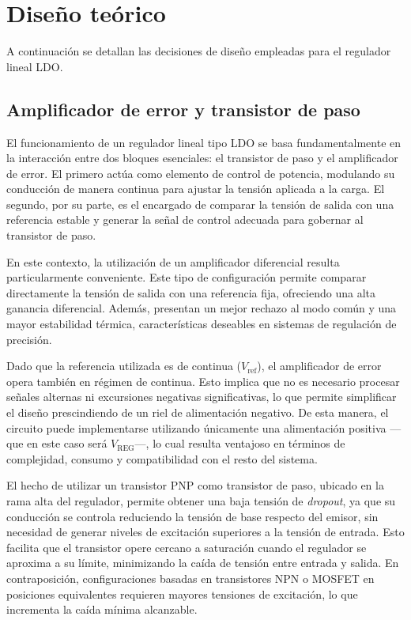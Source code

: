 \documentclass[a4paper,12pt]{article}
\begin{document}
\section{Diseño teórico}

A continuación se detallan las decisiones de diseño empleadas para el regulador lineal LDO.

\subsection{Amplificador de error y transistor de paso}

El funcionamiento de un regulador lineal tipo LDO se basa fundamentalmente en la interacción entre dos bloques esenciales: el transistor de paso y el amplificador de error. El primero actúa como elemento de control de potencia, modulando su conducción de manera continua para ajustar la tensión aplicada a la carga. El segundo, por su parte, es el encargado de comparar la tensión de salida con una referencia estable y generar la señal de control adecuada para gobernar al transistor de paso.

En este contexto, la utilización de un amplificador diferencial resulta particularmente conveniente. Este tipo de configuración permite comparar directamente la tensión de salida con una referencia fija, ofreciendo una alta ganancia diferencial. Además, presentan un mejor rechazo al modo común y una mayor estabilidad térmica, características deseables en sistemas de regulación de precisión.

Dado que la referencia utilizada es de continua ($V_\text{ref}$), el amplificador de error opera también en régimen de continua. Esto implica que no es necesario procesar señales alternas ni excursiones negativas significativas, lo que permite simplificar el diseño prescindiendo de un riel de alimentación negativo. De esta manera, el circuito puede implementarse utilizando únicamente una alimentación positiva ---que en este caso será $V_\text{REG}$---, lo cual resulta ventajoso en términos de complejidad, consumo y compatibilidad con el resto del sistema. 

El hecho de utilizar un transistor PNP como transistor de paso, ubicado en la rama alta del regulador, permite obtener una baja tensión de \textit{dropout}, ya que su conducción se controla reduciendo la tensión de base respecto del emisor, sin necesidad de generar niveles de excitación superiores a la tensión de entrada. Esto facilita que el transistor opere cercano a saturación cuando el regulador se aproxima a su límite, minimizando la caída de tensión entre entrada y salida. En contraposición, configuraciones basadas en transistores NPN o MOSFET en posiciones equivalentes requieren mayores tensiones de excitación, lo que incrementa la caída mínima alcanzable.
\end{document}
